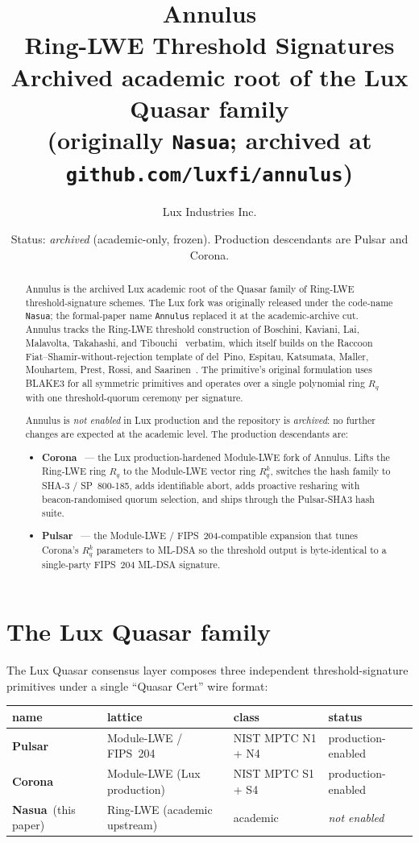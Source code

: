 \documentclass[11pt,a4paper]{article}
\title{Annulus\\
       \large Ring-LWE Threshold Signatures\\
       Archived academic root of the Lux Quasar family\\
       \normalsize (originally \texttt{Nasua}; archived at \texttt{github.com/luxfi/annulus})}
\author{Lux Industries Inc.}
\date{Status: \emph{archived} (academic-only, frozen). Production descendants are Pulsar and Corona.}
\theoremstyle{definition}
\theoremstyle{remark}
\newcommand{\Rq}{R_q}
\begin{document}
\luxcoverpage
\maketitle

\begin{abstract}
Annulus is the archived Lux academic root of the Quasar family of
Ring-LWE threshold-signature schemes. The Lux fork was originally
released under the code-name \texttt{Nasua}; the formal-paper name
\texttt{Annulus} replaced it at the academic-archive cut. Annulus
tracks the Ring-LWE threshold construction of Boschini, Kaviani, Lai, Malavolta,
Takahashi, and Tibouchi~\cite{ringtail} verbatim, which
itself builds on the Raccoon Fiat--Shamir-without-rejection
template of del~Pino, Espitau, Katsumata, Maller, Mouhartem,
Prest, Rossi, and Saarinen~\cite{raccoon2024}. The primitive's
original formulation uses BLAKE3 for all symmetric primitives and
operates over a single polynomial ring $\Rq$ with one
threshold-quorum ceremony per signature.

Annulus is \emph{not enabled} in Lux production and the repository
is \emph{archived}: no further changes are expected at the
academic level. The production descendants are:
\begin{itemize}[leftmargin=*, itemsep=0pt]
\item \textbf{Corona}~\cite{corona} --- the Lux production-hardened
Module-LWE fork of Annulus. Lifts the Ring-LWE ring $\Rq$ to the
Module-LWE vector ring $\Rq^k$, switches the hash family to
SHA-3 / SP~800-185, adds identifiable abort, adds proactive resharing
with beacon-randomised quorum selection, and ships through the
Pulsar-SHA3 hash suite.
\item \textbf{Pulsar}~\cite{pulsar} --- the Module-LWE /
FIPS~204-compatible expansion that tunes Corona's $\Rq^k$
parameters to ML-DSA so the threshold output is
byte-identical to a single-party FIPS~204 ML-DSA signature.
\end{itemize}
\end{abstract}

\section{The Lux Quasar family}
\label{sec:family}

The Lux Quasar consensus layer composes three independent
threshold-signature primitives under a single ``Quasar Cert'' wire
format:

\begin{center}\small
\begin{tabular}{l l l l}
\toprule
name & lattice & class & status \\
\midrule
\textbf{Pulsar} & Module-LWE / FIPS~204     & NIST MPTC N1 + N4 & production-enabled \\
\textbf{Corona} & Module-LWE (Lux production) & NIST MPTC S1 + S4 & production-enabled \\
\textbf{Nasua}~(this paper) & Ring-LWE (academic upstream) & academic & \emph{not enabled} \\
\bottomrule
\end{tabular}
\end{center}
\end{document}
